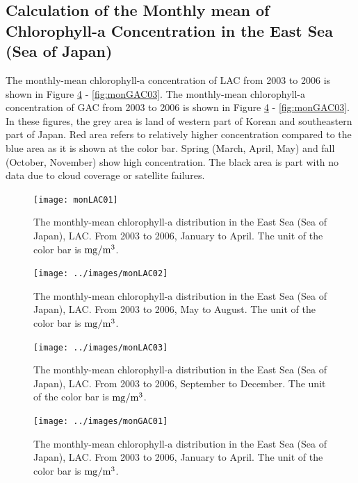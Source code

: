\subsection{Calculation of the Monthly mean of Chlorophyll-a Concentration in the East Sea (Sea of Japan)}
The monthly-mean chlorophyll-a concentration of LAC from 2003 to 2006 is shown in Figure \ref{fig:monGAC01} - \ref{fig:monGAC03}. The monthly-mean chlorophyll-a concentration of GAC from 2003 to 2006 is shown in Figure \ref{fig:monGAC01} - \ref{fig:monGAC03}. In these figures, the grey area is land of western part of Korean and southeastern part of Japan. Red area refers to relatively higher concentration compared to the blue area as it is shown at the color bar. Spring (March, April, May) and fall (October, November) show high concentration. The black area is part with no data due to cloud coverage or satellite failures. 

\begin{figure}[p]
	\centering
	\texttt{[image: monLAC01]}\\
	\caption{The monthly-mean chlorophyll-a distribution in the East Sea (Sea of Japan), LAC. From 2003 to 2006, January to April. The unit of the color bar is $\rm mg/m^3$.}
	\label{fig:monLAC01}
\end{figure}


\begin{figure}[p]
	\centering
	\texttt{[image: ../images/monLAC02]}\\
	\caption{The monthly-mean chlorophyll-a distribution in the East Sea (Sea of Japan), LAC. From 2003 to 2006, May to August. The unit of the color bar is $\rm mg/m^3$.}
	\label{fig:monLAC02}
\end{figure}

\begin{figure}[p]
	\centering
	\texttt{[image: ../images/monLAC03]}\\
	\caption{The monthly-mean chlorophyll-a distribution in the East Sea (Sea of Japan), LAC. From 2003 to 2006, September to December. The unit of the color bar is $\rm mg/m^3$.}
	\label{fig:monLAC03}
\end{figure}


\begin{figure}[p]
	\centering
	\texttt{[image: ../images/monGAC01]}\\
	\caption{The monthly-mean chlorophyll-a distribution in the East Sea (Sea of Japan), LAC. From 2003 to 2006, January to April. The unit of the color bar is $\rm mg/m^3$.}
	\label{fig:monGAC01}
\end{figure}


